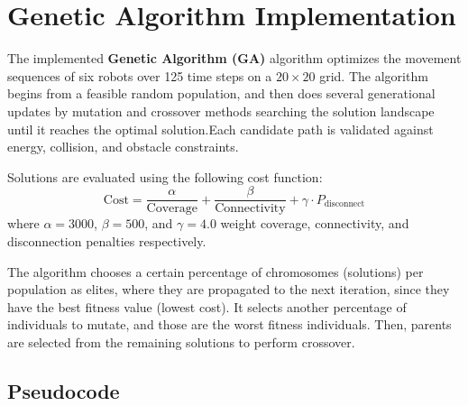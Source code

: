 \section{Genetic Algorithm Implementation}

The implemented \textbf{Genetic Algorithm (GA)} algorithm optimizes the movement sequences of six robots over 125 time steps on a $20 \times 20$ grid. The algorithm begins from a feasible random population, and then does several generational updates by mutation and crossover methods searching the solution landscape until it reaches the optimal solution.Each candidate path is validated against energy, collision, and obstacle constraints.

Solutions are evaluated using the following cost function:
\[
\text{Cost} = \frac{\alpha}{\text{Coverage}} + \frac{\beta}{\text{Connectivity}} + \gamma \cdot P_{\text{disconnect}}
\]
where $\alpha=3000$, $\beta=500$, and $\gamma=4.0$ weight coverage, connectivity, and disconnection penalties respectively.  

The algorithm chooses a certain percentage of chromosomes (solutions) per population as elites, where they are propagated to the next iteration, since they have the best fitness value (lowest cost). It selects another percentage of individuals to mutate, and those are the worst fitness individuals. Then, parents are selected from the remaining solutions to perform crossover.

\subsection{Pseudocode}

